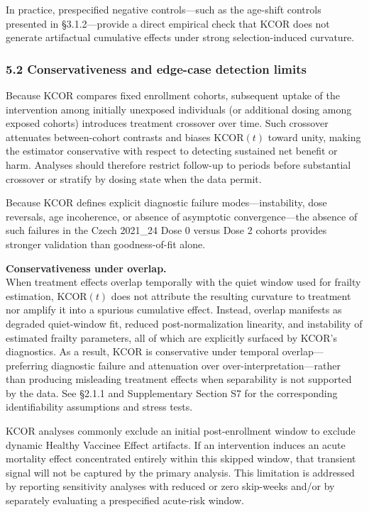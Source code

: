 \documentclass[
]{article}
\begin{document}
In practice, prespecified negative controls---such as the age-shift
controls presented in §3.1.2---provide a direct empirical check that
KCOR does not generate artifactual cumulative effects under strong
selection-induced curvature.

\subsubsection{5.2 Conservativeness and edge-case detection
limits}\label{conservativeness-and-edge-case-detection-limits}

Because KCOR compares fixed enrollment cohorts, subsequent uptake of the
intervention among initially unexposed individuals (or additional dosing
among exposed cohorts) introduces treatment crossover over time. Such
crossover attenuates between-cohort contrasts and biases
\(\mathrm{KCOR}(t)\) toward unity, making the estimator conservative
with respect to detecting sustained net benefit or harm. Analyses should
therefore restrict follow-up to periods before substantial crossover or
stratify by dosing state when the data permit.

Because KCOR defines explicit diagnostic failure modes---instability,
dose reversals, age incoherence, or absence of asymptotic
convergence---the absence of such failures in the Czech 2021\_24 Dose 0
versus Dose 2 cohorts provides stronger validation than goodness-of-fit
alone.

\textbf{Conservativeness under overlap.}\\
When treatment effects overlap temporally with the quiet window used for
frailty estimation, \(\mathrm{KCOR}(t)\) does not attribute the
resulting curvature to treatment nor amplify it into a spurious
cumulative effect. Instead, overlap manifests as degraded quiet-window
fit, reduced post-normalization linearity, and instability of estimated
frailty parameters, all of which are explicitly surfaced by KCOR's
diagnostics. As a result, KCOR is conservative under temporal
overlap---preferring diagnostic failure and attenuation over
over-interpretation---rather than producing misleading treatment effects
when separability is not supported by the data. See §2.1.1 and
Supplementary Section S7 for the corresponding identifiability
assumptions and stress tests.

KCOR analyses commonly exclude an initial post-enrollment window to
exclude dynamic Healthy Vaccinee Effect artifacts. If an intervention
induces an acute mortality effect concentrated entirely within this
skipped window, that transient signal will not be captured by the
primary analysis. This limitation is addressed by reporting sensitivity
analyses with reduced or zero skip-weeks and/or by separately evaluating
a prespecified acute-risk window.
\end{document}
